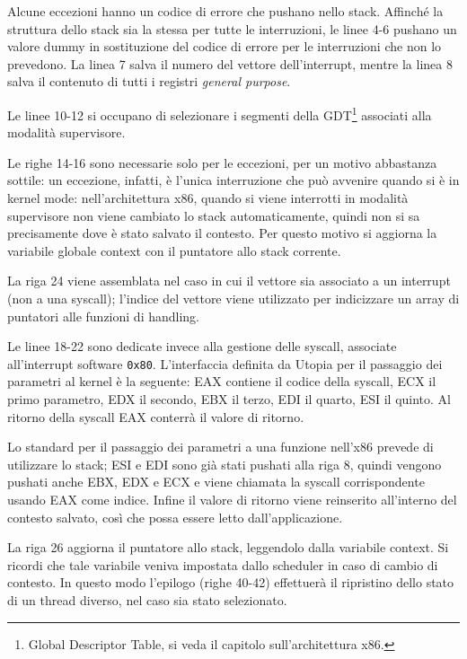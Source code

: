 \documentclass[12pt,a4paper]{report}
\begin{document}
			Alcune eccezioni hanno un codice di errore che pushano nello stack. Affinché la struttura dello stack sia la stessa
			per tutte le interruzioni, le linee 4-6 pushano un valore dummy in sostituzione del codice di errore per le interruzioni
			che non lo prevedono. La linea 7 salva il numero del vettore dell'interrupt, mentre la linea 8 salva il contenuto
			di tutti i registri \emph{general purpose}.
			
			Le linee 10-12 si occupano di selezionare i segmenti della GDT\footnote{Global Descriptor Table, si veda il capitolo
			sull'architettura x86.} associati alla modalità supervisore.
			
			Le righe 14-16 sono necessarie solo per le eccezioni, per un motivo abbastanza sottile: un eccezione, infatti, è l'unica
			interruzione che può avvenire quando si è in kernel mode: nell'architettura x86, quando si viene interrotti in modalità
			supervisore non viene cambiato lo stack automaticamente, quindi non si sa precisamente dove è stato salvato il contesto.
			Per questo motivo si aggiorna la variabile globale context con il puntatore allo stack corrente.
			
			La riga 24 viene assemblata nel caso in cui il vettore sia associato a un interrupt (non a una syscall); l'indice del vettore
			viene utilizzato per indicizzare un array di puntatori alle funzioni di handling.
			
			Le linee 18-22 sono dedicate invece alla gestione delle syscall, associate all'interrupt software \texttt{0x80}.
			L'interfaccia definita da Utopia per il passaggio dei parametri al kernel è la seguente: EAX contiene il codice della syscall,
			ECX il primo parametro, EDX il secondo, EBX il terzo, EDI il quarto, ESI il quinto. Al ritorno della syscall EAX conterrà
			il valore di ritorno.
			
			Lo standard per il passaggio dei parametri a una funzione nell'x86 prevede di utilizzare lo stack; ESI e EDI sono già
			stati pushati alla riga 8, quindi vengono pushati anche EBX, EDX e ECX e viene chiamata la syscall corrispondente
			usando EAX come indice. Infine il valore di ritorno viene reinserito all'interno del contesto salvato, così che possa
			essere letto dall'applicazione.
			
			La riga 26 aggiorna il puntatore allo stack, leggendolo dalla variabile context. Si ricordi che tale variabile veniva
			impostata dallo scheduler in caso di cambio di contesto. In questo modo l'epilogo (righe 40-42) effettuerà il
			ripristino dello stato di un thread diverso, nel caso sia stato selezionato.
			
\end{document}
